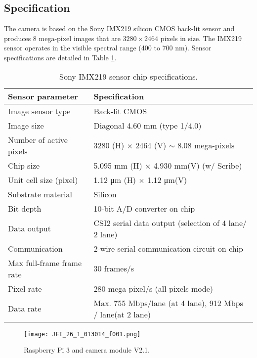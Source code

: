 \subsection{Specification}
\label{ssec:raspcamspecification}
The camera is based on the Sony IMX219 silicon CMOS back-lit sensor and produces
8 mega-pixel images that are $3280 \times 2464$ pixels in size. The IMX219
sensor operates in the visible spectral range (400 to 700 \si{\nano\meter}).
Sensor specifications are detailed in Table
\ref{tab:raspicamspec}.\cite{raspberrycam2}
%
\begin{table}[!h]
	\centering
	\caption{Sony IMX219 sensor chip specifications.}
	\label{tab:raspicamspec}
	\begin{tabular}{l l}
		\hline
		\textbf{Sensor parameter}			& 	\textbf{Specification}\\
		\hline
		Image sensor type		&	Back-lit CMOS\\
		Image size				&	Diagonal 4.60 \si{\milli\meter} (type 1/4.0)\\
		Number of active pixels	&	3280 (H) $\times$ 2464 (V) $\sim$ 8.08 mega-pixels\\
		Chip size				&	5.095 \si{\milli\meter} (H) $\times$ 4.930 \si{\milli\meter}(V) (w/ Scribe)\\	
		Unit cell size (pixel) 	&	1.12 \si{\micro\meter} (H) $\times$ 1.12 \si{\micro\meter}(V)\\
		Substrate material		&	Silicon\\
		Bit depth				&	10-bit A/D converter on chip\\
		Data output				&	CSI2 serial data output (selection of 4 lane/ 2 lane)\\
		Communication			&	2-wire serial communication circuit on chip\\
		Max full-frame frame rate &	30 frames/s \\
		Pixel rate 				&	280 mega-pixel/s (all-pixels mode)\\
		Data rate				&	Max. 755 Mbps/lane (at 4 lane), 912 Mbps / lane(at 2 lane)\\
		\hline
	\end{tabular}
\end{table}


\begin{figure}[htb]
	\centering
    \texttt{[image: JEI\_26\_1\_013014\_f001.png]}
    \caption{Raspberry Pi 3 and camera module V2.1.}
    \label{fig:boardcam}
\end{figure}